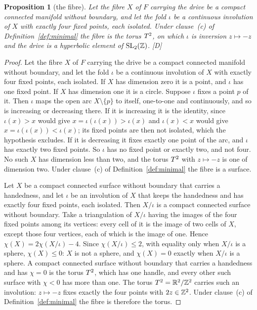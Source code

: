 \documentclass[11pt,a4paper]{article}
\theoremstyle{plain}
\newtheorem{proposition}[theorem]{Proposition}
\theoremstyle{definition}
\theoremstyle{remark}
\newcommand{\rigD}{[\textup{D}]}
\begin{document}
\begin{proposition}[the fibre]\label{prop:surface}
Let the fibre $X$ of $F$ carrying the drive be a compact connected manifold without boundary, and let the fold $\iota$ be a continuous involution of $X$ with exactly four fixed points, each isolated.
Under clause~(c) of Definition~\ref{def:minimal} the fibre is the torus $T^2$, on which $\iota$ is inversion $z\mapsto-z$ and the drive is a hyperbolic element of $\mathrm{SL}_{2}(\mathbb{Z})$.
 \rigD
\end{proposition}

\begin{proof}
Let the fibre $X$ of $F$ carrying the drive be a compact connected manifold without boundary, and let the fold $\iota$ be a continuous involution of $X$ with exactly four fixed points, each isolated. If $X$ has dimension zero it is a point, and $\iota$ has one fixed point. If $X$ has dimension one it is a circle. Suppose $\iota$ fixes a point $p$ of it. Then $\iota$ maps the open arc $X\setminus\{p\}$ to itself, one-to-one and continuously, and so is increasing or decreasing there. If it is increasing it is the identity, since $\iota(x)>x$ would give $x=\iota(\iota(x))>\iota(x)$ and $\iota(x)<x$ would give $x=\iota(\iota(x))<\iota(x)$; its fixed points are then not isolated, which the hypothesis excludes. If it is decreasing it fixes exactly one point of the arc, and $\iota$ has exactly two fixed points. So $\iota$ has no fixed point or exactly two, and not four. No such $X$ has dimension less than two, and the torus $T^2$ with $z\mapsto-z$ is one of dimension two. Under clause~(c) of Definition~\ref{def:minimal} the fibre is a surface.

Let $X$ be a compact connected surface without boundary that carries a handedness, and let $\iota$ be an involution of $X$ that keeps the handedness and has exactly four fixed points, each isolated. Then $X/\iota$ is a compact connected surface without boundary. Take a triangulation of $X/\iota$ having the images of the four fixed points among its vertices: every cell of it is the image of two cells of $X$, except those four vertices, each of which is the image of one. Hence $\chi(X)=2\chi(X/\iota)-4$. Since $\chi(X/\iota)\le2$, with equality only when $X/\iota$ is a sphere, $\chi(X)\le0$: $X$ is not a sphere, and $\chi(X)=0$ exactly when $X/\iota$ is a sphere. A compact connected surface without boundary that carries a handedness and has $\chi=0$ is the torus $T^2$, which has one handle, and every other such surface with $\chi<0$ has more than one. The torus $T^2=\mathbb{R}^{2}/\mathbb{Z}^{2}$ carries such an involution: $z\mapsto-z$ fixes exactly the four points with $2z\in\mathbb{Z}^{2}$. Under clause~(c) of Definition~\ref{def:minimal} the fibre is therefore the torus.


\end{proof}
\end{document}
